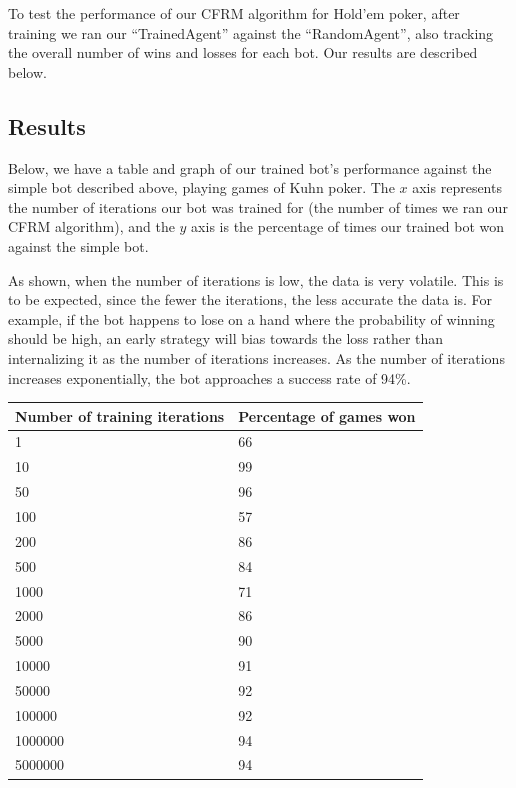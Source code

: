 \documentclass[11pt]{article}
\begin{document}
To test the performance of our CFRM algorithm for Hold'em poker, after training we ran our ``TrainedAgent'' against the ``RandomAgent'', also tracking the overall number of wins and losses for each bot. Our results are described below.

\subsection{Results}
Below, we have a table and graph of our trained bot's performance against the simple bot described above, playing games of Kuhn poker. The $x$ axis represents the number of iterations our bot was trained for (the number of times we ran our CFRM algorithm), and the $y$ axis is the percentage of times our trained bot won against the simple bot.

As shown, when the number of iterations is low, the data is very volatile. This is to be expected, since the fewer the iterations, the less accurate the data is. For example, if the bot happens to lose on a hand where the probability of winning should be high, an early strategy will bias towards the loss rather than internalizing it as the number of iterations increases. As the number of iterations increases exponentially, the bot approaches a success rate of 94\%.

\begin{table}
\centering
    \begin{tabular}{|l|l|}
    \hline
    \textbf{Number of training iterations} & \textbf{Percentage of games won} \\ \hline
    1 & 66 \\ \hline
    10 & 99 \\ \hline
    50 & 96 \\ \hline
    100 & 57 \\ \hline
    200 & 86 \\ \hline
    500 & 84 \\ \hline
    1000 & 71 \\ \hline
    2000 & 86 \\ \hline
    5000 & 90 \\ \hline
    10000 & 91 \\ \hline
    50000 & 92 \\ \hline
    100000 & 92 \\ \hline
    1000000 & 94 \\ \hline
    5000000 & 94 \\ \hline
    \end{tabular}
\end{table}
\end{document}
